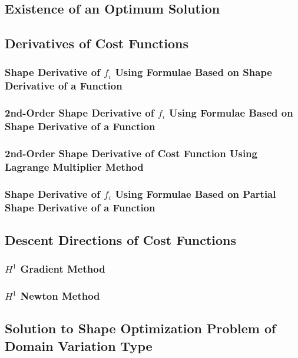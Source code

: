 \documentclass[oneside]{book}
\numberwithin{equation}{section}
\begin{document}
\subsection{Existence of an Optimum Solution}

\subsection{Derivatives of Cost Functions}

\subsubsection{Shape Derivative of $f_i$ Using Formulae Based on Shape Derivative of a Function}

\subsubsection{2nd-Order Shape Derivative of $f_i$ Using Formulae Based on Shape Derivative of a Function}

\subsubsection{2nd-Order Shape Derivative of Cost Function Using Lagrange Multiplier Method}

\subsubsection{Shape Derivative of $f_i$ Using Formulae Based on Partial Shape Derivative of a Function}

\subsection{Descent Directions of Cost Functions}

\subsubsection{$H^1$ Gradient Method}

\subsubsection{$H^1$ Newton Method}

\subsection{Solution to Shape Optimization Problem of Domain Variation Type}
\end{document}
